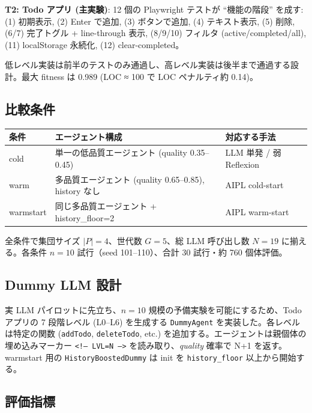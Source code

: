\documentclass[a4paper,11pt]{ltjsarticle}
\begin{document}
\textbf{T2: Todo アプリ (主実験)}: 12 個の Playwright テストが ``機能の階段'' を成す: (1) 初期表示, (2) Enter で追加, (3) ボタンで追加, (4) テキスト表示, (5) 削除, (6/7) 完了トグル + line-through 表示, (8/9/10) フィルタ (active/completed/all), (11) localStorage 永続化, (12) clear-completed。

低レベル実装は前半のテストのみ通過し、高レベル実装は後半まで通過する設計。最大 fitness は 0.989 (LOC ≈ 100 で LOC ペナルティ約 0.14)。

\subsection{比較条件}

\begin{table}[h]\centering
\begin{tabular}{@{}lll@{}}
\toprule
条件 & エージェント構成 & 対応する手法 \\
\midrule
cold      & 単一の低品質エージェント (quality 0.35--0.45) & LLM 単発 / 弱 Reflexion \\
warm      & 多品質エージェント (quality 0.65--0.85), history なし & AIPL cold-start \\
warmstart & 同じ多品質エージェント + history\_floor=2 & AIPL warm-start \\
\bottomrule
\end{tabular}
\end{table}

全条件で集団サイズ $|P| = 4$、世代数 $G = 5$、総 LLM 呼び出し数 $N = 19$ に揃える。各条件 $n = 10$ 試行（seed 101--110）、合計 30 試行・約 760 個体評価。

\subsection{Dummy LLM 設計}

実 LLM パイロットに先立ち、$n=10$ 規模の予備実験を可能にするため、Todo アプリの 7 段階レベル (L0--L6) を生成する \texttt{DummyAgent} を実装した。各レベルは特定の関数 (\texttt{addTodo}, \texttt{deleteTodo}, etc.) を追加する。エージェントは親個体の埋め込みマーカー \texttt{<!-- LVL=N -->} を読み取り、\textit{quality} 確率で N+1 を返す。warmstart 用の \texttt{HistoryBoostedDummy} は init を \texttt{history\_floor} 以上から開始する。

\subsection{評価指標}
\end{document}
